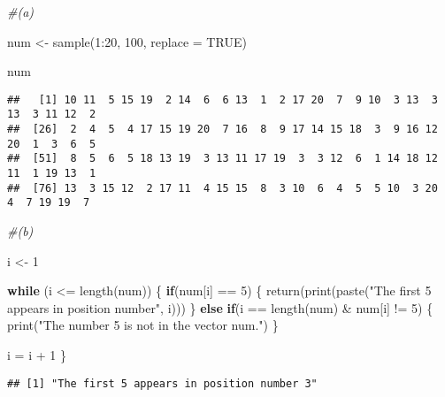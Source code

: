 \documentclass[
]{article}
\newenvironment{Shaded}{\begin{snugshade}}{\end{snugshade}}
\newcommand{\AttributeTok}[1]{\textcolor[rgb]{0.77,0.63,0.00}{#1}}
\newcommand{\CommentTok}[1]{\textcolor[rgb]{0.56,0.35,0.01}{\textit{#1}}}
\newcommand{\ConstantTok}[1]{\textcolor[rgb]{0.00,0.00,0.00}{#1}}
\newcommand{\ControlFlowTok}[1]{\textcolor[rgb]{0.13,0.29,0.53}{\textbf{#1}}}
\newcommand{\DecValTok}[1]{\textcolor[rgb]{0.00,0.00,0.81}{#1}}
\newcommand{\FunctionTok}[1]{\textcolor[rgb]{0.00,0.00,0.00}{#1}}
\newcommand{\NormalTok}[1]{#1}
\newcommand{\OtherTok}[1]{\textcolor[rgb]{0.56,0.35,0.01}{#1}}
\newcommand{\SpecialCharTok}[1]{\textcolor[rgb]{0.00,0.00,0.00}{#1}}
\newcommand{\StringTok}[1]{\textcolor[rgb]{0.31,0.60,0.02}{#1}}
\begin{document}
\begin{Shaded}
\begin{Highlighting}[]
\CommentTok{\#(a)}

\NormalTok{num }\OtherTok{\textless{}{-}} \FunctionTok{sample}\NormalTok{(}\DecValTok{1}\SpecialCharTok{:}\DecValTok{20}\NormalTok{, }\DecValTok{100}\NormalTok{, }\AttributeTok{replace =} \ConstantTok{TRUE}\NormalTok{)}

\NormalTok{num}
\end{Highlighting}
\end{Shaded}

\begin{verbatim}
##   [1] 10 11  5 15 19  2 14  6  6 13  1  2 17 20  7  9 10  3 13  3 13  3 11 12  2
##  [26]  2  4  5  4 17 15 19 20  7 16  8  9 17 14 15 18  3  9 16 12 20  1  3  6  5
##  [51]  8  5  6  5 18 13 19  3 13 11 17 19  3  3 12  6  1 14 18 12 11  1 19 13  1
##  [76] 13  3 15 12  2 17 11  4 15 15  8  3 10  6  4  5  5 10  3 20  4  7 19 19  7
\end{verbatim}

\begin{Shaded}
\begin{Highlighting}[]
\CommentTok{\#(b)}

\NormalTok{i }\OtherTok{\textless{}{-}} \DecValTok{1}

\ControlFlowTok{while}\NormalTok{ (i }\SpecialCharTok{\textless{}=} \FunctionTok{length}\NormalTok{(num)) \{}
  \ControlFlowTok{if}\NormalTok{(num[i] }\SpecialCharTok{==} \DecValTok{5}\NormalTok{) \{}
    \FunctionTok{return}\NormalTok{(}\FunctionTok{print}\NormalTok{(}\FunctionTok{paste}\NormalTok{(}\StringTok{"The first 5 appears in position number"}\NormalTok{, i)))}
\NormalTok{  \} }\ControlFlowTok{else} \ControlFlowTok{if}\NormalTok{(i }\SpecialCharTok{==} \FunctionTok{length}\NormalTok{(num) }\SpecialCharTok{\&}\NormalTok{ num[i] }\SpecialCharTok{!=} \DecValTok{5}\NormalTok{) \{}
      \FunctionTok{print}\NormalTok{(}\StringTok{"The number 5 is not in the vector num."}\NormalTok{)}
\NormalTok{    \}}
  
\NormalTok{  i }\OtherTok{=}\NormalTok{ i }\SpecialCharTok{+} \DecValTok{1}
\NormalTok{\}}
\end{Highlighting}
\end{Shaded}

\begin{verbatim}
## [1] "The first 5 appears in position number 3"
\end{verbatim}
\end{document}
